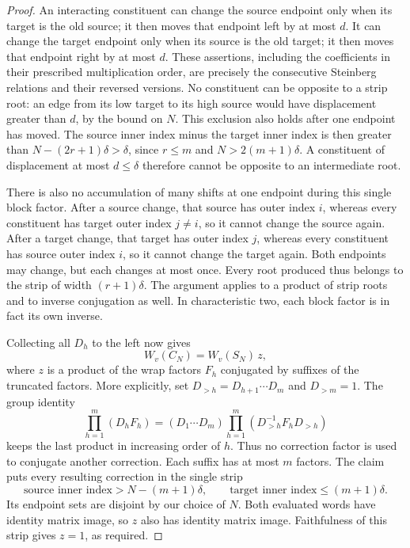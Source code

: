 \begin{proof}
An interacting constituent can change the source endpoint only
when its target is the old source; it then moves that endpoint
left by at most $d$.  It can change the target endpoint only when
its source is the old target; it then moves that endpoint right
by at most $d$.  These assertions, including the coefficients in
their prescribed multiplication order, are precisely the consecutive
Steinberg relations and their reversed versions.  No constituent
can be opposite to a strip root: an edge from its low target to
its high source would have displacement greater than $d$, by the
bound on $N$. This exclusion also holds after one endpoint has moved.
The source inner index minus the target inner index is then greater
than $N-(2r+1)\delta>\delta$, since $r\leq m$ and
$N>2(m+1)\delta$. A constituent of displacement at most $d\leq\delta$
therefore cannot be opposite to an intermediate root.

There is also no accumulation of many shifts at one endpoint during
this single block factor.  After a source change, that source has
outer index $i$, whereas every constituent has target outer index
$j\ne i$, so it cannot change the source again.  After a target
change, that target has outer index $j$, whereas every constituent
has source outer index $i$, so it cannot change the target again.
Both endpoints may change, but each changes at most once.  Every
root produced thus belongs to the strip of width $(r+1)\delta$.
The argument applies to a product of strip roots and to inverse
conjugation as well.  In characteristic two, each block factor is
in fact its own inverse.

Collecting all $D_h$ to the left now gives
\[
 W_v(C_N)=W_v(S_N)\,z,
\]
where $z$ is a product of the wrap factors $F_h$ conjugated by
suffixes of the truncated factors. More explicitly, set
$D_{>h}=D_{h+1}\cdots D_m$ and $D_{>m}=1$. The group identity
\[
 \prod_{h=1}^m(D_hF_h)
 =(D_1\cdots D_m)
   \prod_{h=1}^m(D_{>h}^{-1}F_hD_{>h})
\]
keeps the last product in increasing order of $h$. Thus no correction
factor is used to conjugate another correction. Each suffix has at
most $m$ factors.  The claim puts every resulting correction in the single
strip
\[
 \text{source inner index}>N-(m+1)\delta,
 \qquad
 \text{target inner index}\leq(m+1)\delta.
\]
Its endpoint sets are disjoint by our choice of $N$.  Both evaluated
words have identity matrix image, so $z$ also has identity matrix
image.  Faithfulness of this strip gives $z=1$, as required.
\end{proof}

